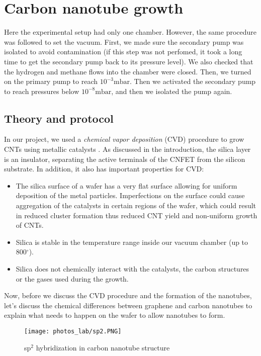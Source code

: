 \documentclass[a4paper,12pt,twoside]{article}
\begin{document}
\newpage
\label{sec:CN_growth}
\section{Carbon nanotube growth}

Here the experimental setup had only one chamber. However, the same procedure was followed to set the vacuum. First, we made sure the secondary pump was isolated to avoid contamination (if this step was not perfomed, it took a long time to get the secondary pump back to its pressure level). We also checked that the hydrogen and methane flows into the chamber were closed. Then, we turned on the primary pump to reach $10^{-3} \mathrm{mbar}$. Then we activated the secondary pump to reach pressures below $10^{-8} \mathrm{mbar}$, and then we isolated the pump again.

\subsection{Theory and protocol}

In our project, we used a \textit{chemical vapor deposition} (CVD) procedure to grow CNTs using metallic catalysts \cite{costel1} \cite{costel2}. As discussed in the introduction, the silica layer is an insulator, separating the active terminals of the CNFET from the silicon substrate. In addition, it also has important properties for CVD:
\begin{itemize}
    \item The silica surface of a wafer has a very flat surface allowing for uniform deposition of the metal particles. Imperfections on the surface could cause aggregation of the catalysts in certain regions of the wafer, which could result in reduced cluster formation thus reduced CNT yield and non-uniform growth of CNTs.
    \item Silica is stable in the temperature range inside our vacuum chamber (up to 800$^{\circ}$).
    \item Silica does not chemically interact with the catalysts, the carbon structures or the gases used during the growth.
\end{itemize}

Now, before we discuss the CVD procedure and the formation of the nanotubes, let's discuss the chemical differences between graphene and carbon nanotubes to explain what needs to happen on the wafer to allow nanotubes to form.

\begin{figure}[H]
    \centering
    \texttt{[image: photos\_lab/sp2.PNG]}
    \caption{sp$^2$ hybridization in carbon nanotube structure}
    \label{fig:sp2}
\end{figure}
\end{document}
